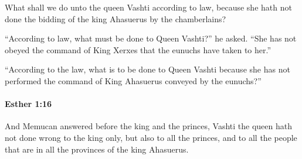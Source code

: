 			\begin{versebox}
					\item[BHS] 
					\item[LXX] 
					\item[ASV] What shall we do unto the queen Vashti according to law, because she hath not done the bidding of the king Ahasuerus by the chamberlains?
					\item[NIV] “According to law, what must be done to Queen Vashti?” he asked. “She has not obeyed the command of King Xerxes that the eunuchs have taken to her.”
					\item[NRSV] “According to the law, what is to be done to Queen Vashti because she has not performed the command of King Ahasuerus conveyed by the eunuchs?”
			\end{versebox}

		\paragraph{Esther 1:16} %
			\label{ESTHER-1-16}

			And Memucan answered before the king and the princes, Vashti the queen hath not done wrong to the king only, but also to all the princes, and to all the people that are in all the provinces of the king Ahasuerus.

